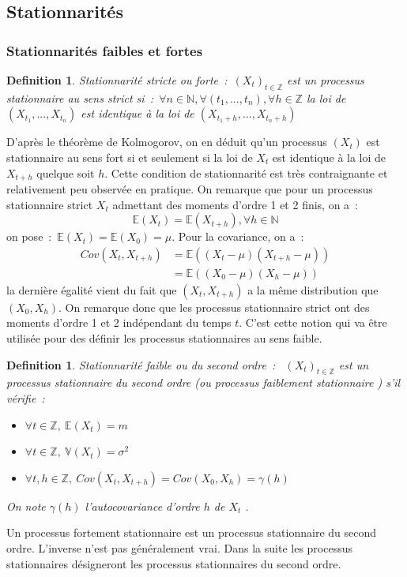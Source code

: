 \documentclass[11pt]{scrartcl} %
\newtheorem{Def}[theorem]{Definition}
\begin{document}
\subsection{Stationnarités}
\subsubsection{Stationnarités faibles et fortes}
\begin{Def}\label{staForte}
Stationnarité stricte ou forte~:~$\left(X_t\right)_{t\in\mathbb{Z}}$ est un processus stationnaire au sens strict si~:~$\forall n\in \mathbb{N}, \forall (t_1,...,t_n), \forall h\in\mathbb{Z}$ la loi de $(X_{t_1},...,X_{t_n})$ est identique à la loi de $(X_{t_1+h},...,X_{t_n+h})$
\end{Def}
D'après le théorème de Kolmogorov, on en déduit qu'un processus $\left(X_t\right)$ est stationnaire au sens fort si et seulement si la loi de $X_t$ est identique à la loi de $X_{t+h}$ quelque soit $h$. Cette condition de stationnarité est très contraignante et relativement peu observée en pratique. On remarque que pour un processus stationnaire strict $X_t$ admettant des moments d'ordre 1 et 2 finis, on a~:
$$
\mathbb{E}\left(X_t\right)=\mathbb{E}\left(X_{t+h}\right), \forall h\in \mathbb{N}
$$
on pose~:~$\mathbb{E}\left(X_t\right)=\mathbb{E}\left(X_0\right)=\mu$. Pour la covariance, on a~:
\begin{align*}
Cov\left(X_t,X_{t+h}\right)& = \mathbb{E}\left((X_t-\mu)(X_{t+h}-\mu)\right)\\
&= \mathbb{E}\left((X_0-\mu)(X_{h}-\mu)\right)
\end{align*}
la dernière égalité vient du fait que $(X_t,X_{t+h})$ a la même distribution que $(X_0,X_h)$.
On remarque donc que les processus stationnaire strict ont des moments d'ordre 1 et 2 indépendant du temps $t$. C'est cette notion qui va être utilisée pour des définir les processus stationnaires au sens faible.
\begin{Def}\label{staFaible}
Stationnarité faible ou du second ordre~:~
$\left(X_t\right)_{t\in\mathbb{Z}}$ est un processus stationnaire du second ordre (ou processus faiblement stationnaire ) s'il vérifie~:
\begin{itemize}
\item[i)]$\forall t\in\mathbb{Z},~\mathbb{E}\left(X_t\right)=m $ 
\item[ii)]$\forall t\in\mathbb{Z},~\mathbb{V}\left(X_t\right)=\sigma^2 $ 
\item[iii)]$\forall t,h\in\mathbb{Z},~Cov\left(X_t,X_{t+h}\right)=Cov\left(X_0,X_h\right)=\gamma\left(h\right) $ 
\end{itemize}
On note $\gamma(h)$ l'autocovariance d'ordre $h$ de $X_t$ .
\end{Def} 
Un processus fortement stationnaire est un processus stationnaire du second ordre. L'inverse n'est pas généralement vrai. Dans la suite les processus stationnaires désigneront les processus stationnaires du second ordre.
\end{document}

